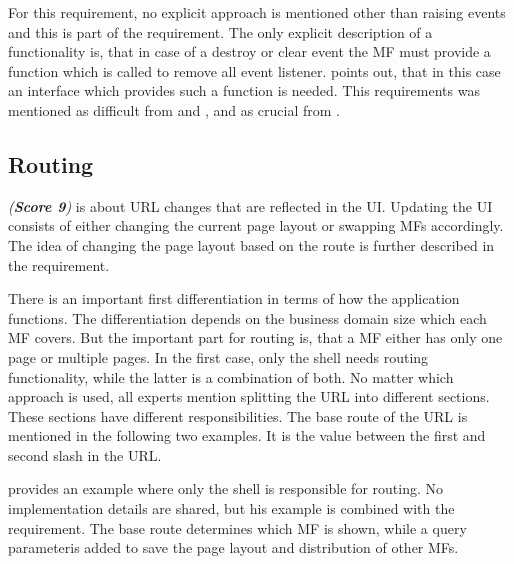 For this requirement, no explicit approach is mentioned other than raising events and this is part of the \textit{} requirement.
The only explicit description of a functionality is, that in case of a destroy or clear event the \ac{MF} must provide a function which is called to remove all event listener.
\textciteMezzalira{} points out, that in this case an interface which provides such a function is needed.
This requirements was mentioned as difficult from \textciteJovanovic{} and \citeauthorMezzalira{}, and as crucial from \textciteHuber{}.





\subsection{Routing}\label{cha:requirement_detail_integration_routing}

\textit{ (\textbf{Score 9})} is about
\ac{URL} changes that are reflected in the \ac{UI}.
Updating the \ac{UI} consists of either changing the current page layout or swapping \acp{MF} accordingly.
The idea of changing the page layout based on the route is further described in the \textit{} requirement.

There is an important first differentiation in terms of how the application functions.
The differentiation depends on the business domain size which each \ac{MF} covers.
But the important part for routing is, that a \ac{MF} either has only one page or multiple pages.
In the first case, only the shell needs routing functionality, while the latter is a combination of both.
No matter which approach is used, all experts mention splitting the \ac{URL} into different sections.
These sections have different responsibilities.
The base route of the \ac{URL} is mentioned in the following two examples.
It is the value between the first and second slash in the \ac{URL}.

\textcite{Grijzen.2019} provides an example where only the shell is responsible for routing.
No implementation details are shared, but his example is combined with the \textit{} requirement.
The base route determines which \ac{MF} is shown, while a query parameter\footnotemark  is added to save the page layout and distribution of other \acp{MF}.

